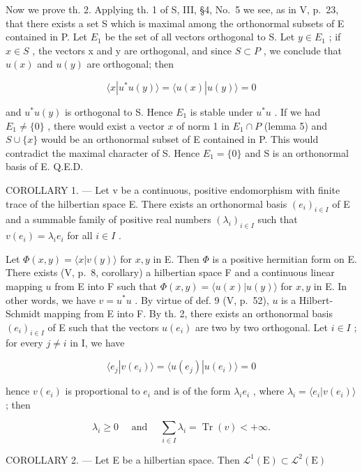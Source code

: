 Now we prove th. 2. Applying th. 1 of S, III, §4, No.~5 we see, as in V, p.~23, that there exists a set S which is maximal among the orthonormal subsets of E contained in P. Let \(E_{1}\) be the set of all vectors orthogonal to S. Let \(y \in E_{1}\) ; if \(x \in S\) , the vectors x and y are orthogonal, and since \(S \subset P\) , we conclude that \(u(x)\) and \(u(y)\) are orthogonal; then

\[
\langle x | u ^ {*} u (y) \rangle = \langle u (x) | u (y) \rangle = 0
\]

and \(u^{*}u(y)\) is orthogonal to S. Hence \(E_{1}\) is stable under \(u^{*}u\) . If we had \(E_{1} \neq \{0\}\) , there would exist a vector \(x\) of norm 1 in \(E_{1} \cap P\) (lemma 5) and \(S \cup \{x\}\) would be an orthonormal subset of E contained in P. This would contradict the maximal character of S. Hence \(E_{1} = \{0\}\) and S is an orthonormal basis of E. Q.E.D.

COROLLARY 1. --- Let v be a continuous, positive endomorphism with finite trace of the hilbertian space E. There exists an orthonormal basis \((e_{i})_{i\in I}\) of E and a summable family of positive real numbers \((\lambda_{i})_{i\in I}\) such that \(v(e_{i}) = \lambda_{i}e_{i}\) for all \(i \in I\) .

Let \(\Phi(x, y) = \langle x | v(y) \rangle\) for \(x, y\) in E. Then \(\Phi\) is a positive hermitian form on E. There exists (V, p.~8, corollary) a hilbertian space F and a continuous linear mapping \(u\) from E into F such that \(\Phi(x, y) = \langle u(x) | u(y) \rangle\) for \(x, y\) in E. In other words, we have \(v = u^{*}u\) . By virtue of def. 9 (V, p.~52), \(u\) is a Hilbert-Schmidt mapping from E into F. By th. 2, there exists an orthonormal basis \((e_{i})_{i \in I}\) of E such that the vectors \(u(e_{i})\) are two by two orthogonal. Let \(i \in I\) ; for every \(j \neq i\) in I, we have

\[
\langle e _ {j} | v (e _ {i}) \rangle = \langle u (e _ {j}) | u (e _ {i}) \rangle = 0
\]

hence \(v(e_{i})\) is proportional to \(e_{i}\) and is of the form \(\lambda_{i}e_{i}\) , where \(\lambda_{i}=\langle e_{i}|v(e_{i})\rangle\) ; then

\[
\lambda_ {i} \geqslant 0 \quad \text { and } \quad \sum_ {i \in I} \lambda_ {i} = \operatorname{Tr} (v) <   + \infty .
\]

COROLLARY 2. --- Let E be a hilbertian space. Then \(\mathcal{L}^{1}(\mathrm{E})\subset \mathcal{L}^{2}(\mathrm{E})\)

